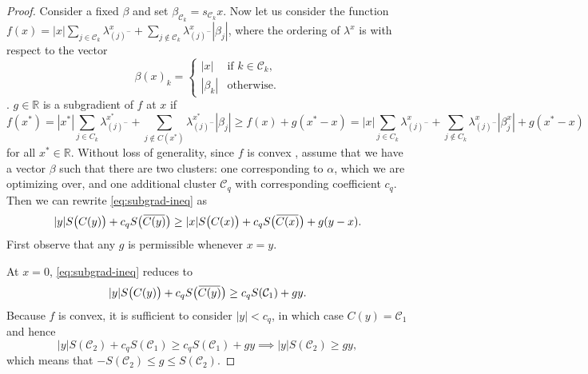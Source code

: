 \begin{proof}
  Consider a fixed \(\beta\) and set \(\beta_{\mathcal{C}_k}= s_{\mathcal{C}_k}x\).
  Now let us consider the function  \(f(x) = |x|\sum_{j \in \mathcal{C}_k}\lambda^x_{(j)^-} + \sum_{j \notin \mathcal{C}_k} \lambda^x_{(j)^-}|\beta_j|\), where the ordering of \(\lambda^x\) is with respect to the vector
  \[
    \beta(x)_k = \begin{cases}
      |x|       & \text{if } \mbox{\(k \in \mathcal{C}_k\)}, \\
      |\beta_k| & \mbox{otherwise}.
    \end{cases}
  \]
  . 
  \(g\in \mathbb{R} \)  is a subgradient of \(f\) at \(x\) if
  \begin{equation}
    \label{eq:subgrad-ineq}
    f(x^*)=|x^*|\sum_{j \in C_k}\lambda^{x^*}_{(j)^-} + \sum_{j \notin C(x^*)}\lambda ^{x^*}_{(j)^-}|\beta_j|
    \geq f(x)+ g(x^* - x)=|x|\sum_{j \in C_k} \lambda^x_{(j)^-} + \sum_{j \notin C_k}\lambda^x_{(j)^-}|\beta^x_j| + g(x^* - x)
  \end{equation}
  for all \(x^* \in \mathbb{R}\).
  Without loss of generality, since \(f\) is convex , assume that we have
  a vector \(\beta\) such that there are two clusters: one corresponding
  to \(\alpha\), which we are optimizing over, and
  one additional cluster \(\mathcal{C}_q\) with corresponding
  coefficient \(c_q\).
  Then we can rewrite \eqref{eq:subgrad-ineq} as
  \[
    |y|S\big(C(y)\big) + c_q S\big(\widebar{C(y)}\big) \geq
    |x| S\big(C(x)\big) + c_q S\big(\widebar{C(x)}\big) + g(y - x).
  \]
  First observe that any \(g\) is permissible whenever \(x = y\).

  At \(x = 0\), \eqref{eq:subgrad-ineq} reduces to
  \[
    |y|S\big(C(y)\big) + c_q S\big(\widebar{C(y)}\big)
    \geq c_q S(\mathcal{C}_1) + gy.
  \]
  Because \(f\) is convex, it is sufficient to consider \(|y| < c_q\),
  in which case \(C(y) = \mathcal{C}_1\) and hence
  \begin{equation}
    |y|S(\mathcal{C}_2) + c_q S(\mathcal{C}_1) \geq c_q S(\mathcal{C}_1) + gy \implies
    |y|S(\mathcal{C}_2) \geq gy,
  \end{equation}
  which means that \(-S(\mathcal{C}_2) \leq g \leq S(\mathcal{C}_2)\).


\end{proof}
